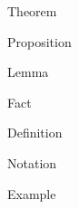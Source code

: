\documentclass{article}
\begin{document}
\begin{theorem}{}{}
    Theorem
\end{theorem}

\begin{proposition}{}{}
    Proposition
\end{proposition}

\begin{lemma}{}{}
    Lemma
\end{lemma}

\begin{fact}{}{}
    Fact
\end{fact}

\begin{definition}{}{}
    Definition
\end{definition}

\begin{notation}{}{}
    Notation
\end{notation}


\begin{example}{}{}
    Example
\end{example}
\end{document}
